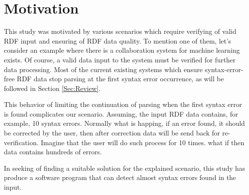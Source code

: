 \section{Motivation} \label{Sec:Motivation}

This study was motivated by various scenarios which require verifying of valid RDF input and ensuring of RDF data quality. To mention one of them, let's consider an example where there is a collaboration system for machine learning exists. Of course, a valid data input to the system must be verified for further data processing. Most of the current existing systems which ensure syntax-error-free RDF data stop parsing at the first syntax error occurrence, as will be followed in Section \ref{Sec:Review}.
\par
This behavior of limiting the continuation of parsing when the first syntax error is found complicates our scenario. Assuming, the input RDF data contains, for example, 10 syntax errors. Normally what is happing, if an error found, it should be corrected by the user, then after correction data will be send back for re-verification. Imagine that the user will do such process for 10 times. what if then data contains hundreds of errors. 

In seeking of finding a suitable solution for the explained scenario, this study has produce a software program that can detect almost syntax errors found in the input. 